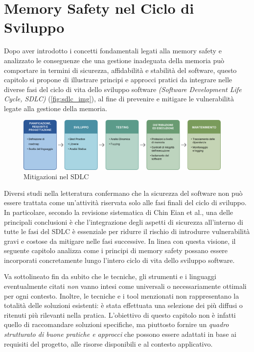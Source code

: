 \chapter{Memory Safety nel Ciclo di Sviluppo}
\label{cha:sdlc}

Dopo aver introdotto i concetti fondamentali legati alla memory safety e
analizzato le conseguenze che una gestione inadeguata della memoria può
comportare in termini di sicurezza, affidabilità e stabilità del software,
questo capitolo si propone di illustrare principi e approcci pratici da
integrare nelle diverse fasi del ciclo di vita dello sviluppo software \textit{(Software
Development Life Cycle, SDLC)} (\autoref{fig:sdlc_img}), al fine di prevenire e
mitigare le vulnerabilità legate alla gestione della memoria.

\begin{figure}[htbp]
  \centering
  \includegraphics[width=0.95\textwidth]{images/sdlc_recap.png}
  \caption[Schema SDLC]{Mitigazioni nel SDLC\protect}
  \label{fig:sdlc_img}
\end{figure}

Diversi studi nella letteratura confermano che la sicurezza del software non può
essere trattata come un'attività riservata solo alle fasi finali del ciclo di sviluppo.
In particolare, secondo la revisione sistematica di Chin Eian et al.\cite{security_in_sdlc},
una delle principali conclusioni è che l'integrazione degli aspetti di sicurezza
all'interno di tutte le fasi del SDLC è essenziale per ridurre il rischio di
introdurre vulnerabilità gravi e costose da mitigare nelle fasi successive. In linea
con questa visione, il seguente capitolo analizza come i principi di memory
safety possano essere incorporati concretamente lungo l'intero ciclo di vita
dello sviluppo software.

Va sottolineato fin da subito che le tecniche, gli strumenti e i linguaggi eventualmente
citati \textit{non} vanno intesi come universali o necessariamente ottimali per
ogni contesto. Inoltre, le tecniche e i tool menzionati non rappresentano la
totalità delle soluzioni esistenti: è stata effettuata una selezione dei più diffusi
o ritenuti più rilevanti nella pratica. L'obiettivo di questo capitolo non è
infatti quello di raccomandare soluzioni specifiche, ma piuttosto fornire un \textit{quadro
strutturato di buone pratiche e approcci} che possono essere adattati in base ai
requisiti del progetto, alle risorse disponibili e al contesto applicativo.






